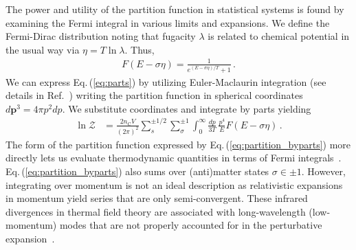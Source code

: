 \documentclass[epjST]{svjour}
\newcommand{\req}[1]{Eq.\,(\ref{#1})}
\begin{document}
The power and utility of the partition function in statistical systems is found by examining the Fermi integral in various limits and expansions. We define the Fermi-Dirac distribution noting that fugacity \(\lambda\) is related to chemical potential in the usual way via \(\eta = T\ln\lambda\). Thus,
\begin{align}
    F\left(E - \sigma\eta\right) = \frac{1}{e^{(E - \sigma\eta)/T} + 1}\,.
\end{align}
We can express \req{eq:parts} by utilizing Euler-Maclaurin integration (see details in Ref.~\cite{Steinmetz:2023nsc,Rafelski:2024fej}) writing the partition function in spherical coordinates \(d\mathbf{p}^{3}=4\pi p^{2}dp\). We substitute coordinates and integrate by parts yielding
\begin{align}
    \label{eq:partition_byparts}
    \ln\mathcal{Z} &= \frac{2 n_\mathrm{C}V}{(2\pi)^{2}} \sum_{s}^{\pm1/2}\sum_{\sigma}^{\pm1}\int_{0}^{\infty} \frac{dp}{3T} \, \frac{p^4}{E}F\left(E - \sigma\eta\right)\,.
\end{align}
The form of the partition function expressed by \req{eq:partition_byparts} more directly lets us evaluate thermodynamic quantities in terms of Fermi integrals~\cite{Elze:1980er,Birrell:2024bdb}. \req{eq:partition_byparts} also sums over (anti)matter states \(\sigma \in {\pm1}\). However, integrating over momentum is not an ideal description as relativistic expansions in momentum yield series that are only semi-convergent. These infrared divergences in thermal field theory are associated with long-wavelength (low-momentum) modes that are not properly accounted for in the perturbative expansion~\cite{Gross:1980br,Linde:1980ts,Bellac:2011kqa,Kapusta:2006pm}.

\end{document}

